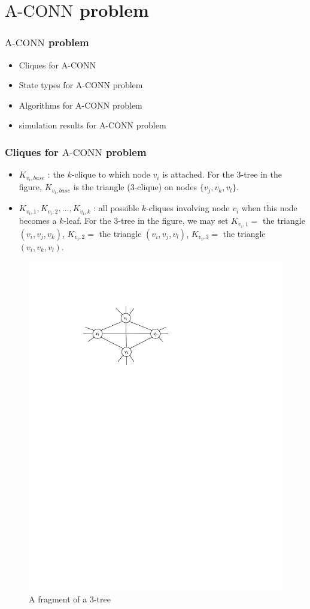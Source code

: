 \documentclass{beamer}
\newcommand{\ACONN}   { {\mathrm {A\mbox{-}CONN}} }
\begin{document}
\section{$\ACONN$ problem}
\begin{frame}
\frametitle{$\ACONN$ problem}
\begin{itemize}
\item Cliques for $\ACONN$
\item State types for $\ACONN$ problem
\item Algorithms for $\ACONN$ problem
\item simulation results for $\ACONN$ problem
\end{itemize}
\end{frame}
\begin{frame}
\frametitle{Cliques for $\ACONN$ problem}
\vspace{-1em}
\begin{itemize}
\item $K_{v_i,base}$ : the $k$-clique to which node $v_i$ is attached. For the 3-tree in the figure, $K_{v_i,base}$ is the triangle (3-clique) on nodes $\{v_j, v_k, v_l\}$.
\item $K_{v_i,1}, K_{v_i,2}, \ldots, K_{v_i,k}$ : all possible $k$-cliques involving node $v_i$ when this node becomes a $k$-leaf. For the 3-tree in the figure, we may set $K_{v_i,1}=$ the triangle $(v_i,v_j,v_k)$, $K_{v_i,2}=$ the triangle $(v_i,v_j,v_l)$, $K_{v_i,3}=$ the triangle $(v_i,v_k,v_l)$.
\end{itemize}
\vspace{-1em}
\begin{figure}[!htb]
\begin{minipage}{0.55\linewidth}
\includegraphics[width=2 in, height=0.8 in]{Ch3f1.pdf}
 \caption{ A fragment of a $3$-tree
 \label{fig:f3t}
}
\end{minipage}
\end{figure}
\end{frame}
\end{document}
